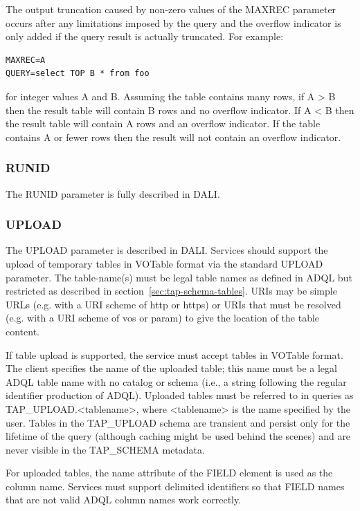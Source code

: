 \documentclass[11pt,letter]{ivoa}
\newcommand{\tapschema}{TAP\_SCHE\-MA}
\newcommand{\tapupload}{TAP\_UPLOAD}
\newcommand{\tapschema}{\mbox{%
  \relsize{-0.5}TAP\discretionary{-}{}{\kern-2pt\_}SCHEMA}}
\newcommand{\tapupload}{%
  {\relsize{-0.5}TAP\discretionary{-}{}{\kern-2pt\_}UPLOAD}}
\begin{document}
The output truncation caused by non-zero values of the MAXREC parameter occurs after any 
limitations imposed by the query and the overflow indicator is only added if 
the query result is actually truncated. For example:

\begin{verbatim}
MAXREC=A
QUERY=select TOP B * from foo
\end{verbatim}

for integer values A and B. Assuming the table contains many rows, if A > B 
then the result table will contain B rows and no overflow indicator. If A < B 
then the result table will contain A rows and an overflow indicator. If the 
table contains A or fewer rows then the result will not contain an overflow 
indicator.

\subsubsection{RUNID}
The RUNID parameter is fully described in DALI.

\subsubsection{UPLOAD}
\label{sec:UPLOAD}

The UPLOAD parameter is described in DALI. Services should support 
the 
upload of temporary tables in VOTable \citep{2013ivoa.spec.0920O} format via the standard 
UPLOAD 
parameter. The table-name(s) must be legal table names as defined in 
ADQL \citep{2008ivoa.spec.1030O} but restricted as described in section~\ref{sec:tap-schema-tables}. 
URIs may be simple URLs (e.g. with a URI scheme of http or https) or 
URIs that must be resolved (e.g. with a URI scheme of vos or param) to give 
the location of the table content.

If table upload is supported, the service must accept tables in VOTable format. 
The client specifies the name of the uploaded table; this name must be a legal 
ADQL table name with no catalog or schema (i.e., a string following the 
regular identifier production of ADQL). Uploaded tables must be 
referred 
to in queries as \tapupload.<tablename>, where <tablename> is the name
specified by the user. Tables in the \tapupload{} schema are 
transient and persist only for the lifetime of the query (although caching might 
be used behind the scenes) and are never visible in the 
\tapschema{} metadata.

For uploaded tables, the name attribute of the FIELD element is used as the column 
name. Services must support delimited identifiers so that 
FIELD names that are not valid ADQL column names work correctly.
\end{document}
